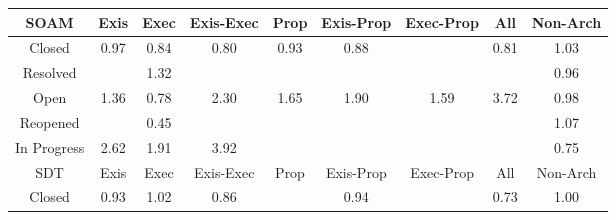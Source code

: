 \begin{tabular}{|c||c|c|c|c|c|c|c|c|}
\hline
\hline
SOAM & Exis & Exec & Exis-Exec & Prop & Exis-Prop & Exec-Prop & All & Non-Arch \\ 
\hline
Closed & \cellcolor[rgb]{0.9036578580939791,0.8099805283115015,0.41408066755438055} 0.97 & \cellcolor[rgb]{0.8781585883806222,0.689283985001612,0.3902813491552474} 0.84 & \cellcolor[rgb]{0.8705702057150636,0.6533656403846342,0.38319885866739267} 0.80 & \cellcolor[rgb]{0.8956277370682171,0.7719712887895607,0.4065858879303359} 0.93 & \cellcolor[rgb]{0.8862542839555239,0.7276036107228129,0.3978373316918222} 0.88 &  & \cellcolor[rgb]{0.8720276618898135,0.660264266278451,0.3845591510971594} 0.81 & \cellcolor[rgb]{0.9091621820398752,0.8396031388609934,0.42} 1.03 \\ 
\hline
Resolved &  & \cellcolor[rgb]{0.8995583584504686,0.8350539592660114,0.42} 1.32 &  &  &  &  &  & \cellcolor[rgb]{0.9020078207252225,0.8021703514327198,0.4125406326768743} 0.96 \\ 
\hline
Open & \cellcolor[rgb]{0.8983065499455503,0.834460997342629,0.42} 1.36 & \cellcolor[rgb]{0.8660375334137352,0.6319109914916798,0.3789683645194862} 0.78 & \cellcolor[rgb]{0.8679402128250241,0.8200769429171166,0.42} 2.30 & \cellcolor[rgb]{0.8889456909470093,0.830026906238057,0.42} 1.65 & \cellcolor[rgb]{0.8809985076489082,0.826262450991588,0.42} 1.90 & \cellcolor[rgb]{0.8907949241132541,0.8309028587904888,0.42} 1.59 & \cellcolor[rgb]{0.8219543760752372,0.7982941781409019,0.42} 3.72 & \cellcolor[rgb]{0.9066319716718324,0.8240579992466731,0.4168565068937102} 0.98 \\ 
\hline
Reopened &  & \cellcolor[rgb]{0.8008558930741552,0.3233845605510009,0.3181321668692115} 0.45 &  &  &  &  &  & \cellcolor[rgb]{0.9075907701332412,0.8388587858525879,0.42} 1.07 \\ 
\hline
In Progress & \cellcolor[rgb]{0.8576304193111871,0.8151933565158255,0.42} 2.62 & \cellcolor[rgb]{0.8804242156070101,0.82599041791911,0.42} 1.91 & \cellcolor[rgb]{0.8154056022696575,0.7951921273908903,0.42} 3.92 &  &  &  &  & \cellcolor[rgb]{0.8606730827248962,0.6065192582311753,0.37396154387656977} 0.75 \\ 
\hline
\hline
SDT & Exis & Exec & Exis-Exec & Prop & Exis-Prop & Exec-Prop & All & Non-Arch \\ 
\hline
Closed & \cellcolor[rgb]{0.8960109727260311,0.7737852709032141,0.40694357454429575} 0.93 & \cellcolor[rgb]{0.9093382958993523,0.8396865612154826,0.42} 1.02 & \cellcolor[rgb]{0.8823396163963306,0.7090741842759651,0.3941836419699086} 0.86 &  & \cellcolor[rgb]{0.8981477328881114,0.7838992690037275,0.40893788402890396} 0.94 &  & \cellcolor[rgb]{0.8553748902398559,0.5814411471353184,0.3690165642238656} 0.73 & \cellcolor[rgb]{0.9099688019011528,0.8399852219531776,0.42} 1.00 \\ 

\end{tabular}
